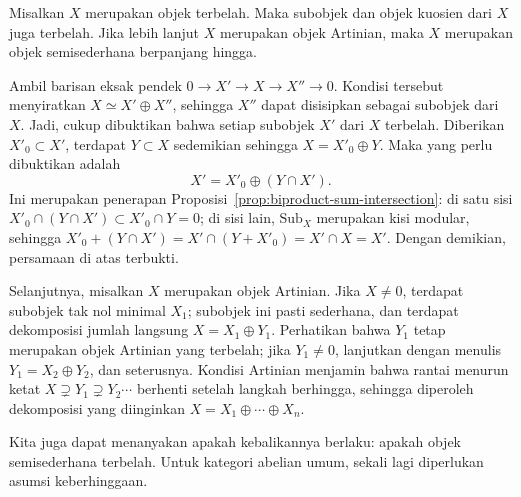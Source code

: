 \begin{proposisi}
    Misalkan $X$ merupakan objek terbelah. Maka subobjek dan objek kuosien dari
$X$ juga terbelah. Jika lebih lanjut $X$ merupakan objek Artinian, maka $X$
merupakan objek semisederhana berpanjang hingga.
\end{proposisi}
\begin{bukti}
    Ambil barisan eksak pendek $0\to X'\to X\to X''\to0$. Kondisi tersebut
menyiratkan $X\simeq X'\oplus X''$, sehingga $X''$ dapat disisipkan sebagai
subobjek dari $X$. Jadi, cukup dibuktikan bahwa setiap
subobjek $X'$ dari $X$ terbelah. Diberikan $X'_0\subset X'$, terdapat
$Y\subset X$ sedemikian sehingga $X=X'_0\oplus Y$. Maka yang perlu
dibuktikan adalah
\[ X'=X'_0\oplus(Y\cap X'). \]
Ini merupakan penerapan Proposisi~\ref{prop:biproduct-sum-intersection}: di
satu sisi $X'_0\cap(Y\cap X')\subset X'_0\cap Y=0$; di sisi lain,
$\mathrm{Sub}_X$ merupakan kisi modular, sehingga
$X'_0+(Y\cap X')=X'\cap(Y+X'_0)=X'\cap X=X'$. Dengan demikian, persamaan di
atas terbukti.

    Selanjutnya, misalkan $X$ merupakan objek Artinian. Jika $X\neq0$, terdapat
subobjek tak nol minimal $X_1$; subobjek ini pasti sederhana, dan terdapat
dekomposisi jumlah langsung $X=X_1\oplus Y_1$. Perhatikan bahwa $Y_1$ tetap
merupakan objek Artinian yang terbelah; jika $Y_1\neq0$, lanjutkan dengan
menulis $Y_1=X_2\oplus Y_2$, dan seterusnya. Kondisi Artinian menjamin bahwa
rantai menurun ketat $X\supsetneq Y_1\supsetneq Y_2\cdots$ berhenti setelah
langkah berhingga, sehingga diperoleh dekomposisi yang diinginkan
$X=X_1\oplus\cdots\oplus X_n$.
\end{bukti}

Kita juga dapat menanyakan apakah kebalikannya berlaku: apakah objek
semisederhana terbelah.
Untuk kategori abelian umum, sekali lagi diperlukan asumsi keberhinggaan.

